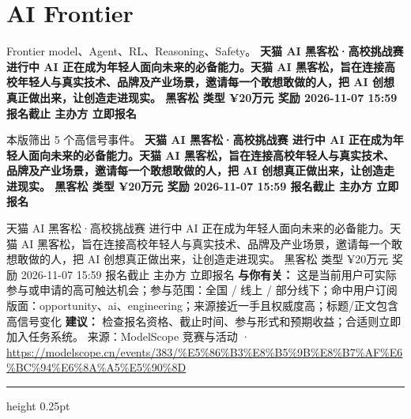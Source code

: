 \documentclass[10.5pt]{ctexart}
\begin{document}
\section*{AI Frontier}
{\color{ormuted} Frontier model、Agent、RL、Reasoning、Safety。}
\vspace{2mm}
{\LARGE\bfseries 天猫 AI 黑客松·高校挑战赛 进行中 AI 正在成为年轻人面向未来的必备能力。天猫 AI 黑客松，旨在连接高校年轻人与真实技术、品牌及产业场景，邀请每一个敢想敢做的人，把 AI 创想真正做出来，让创造走进现实。 黑客松 类型 ¥20万元 奖励 2026-11-07 15:59 报名截止 主办方 立即报名}\par
\vspace{1mm}
{\color{ormuted} 本版筛出 5 个高信号事件。}
\vspace{3mm}
{\Large\bfseries 天猫 AI 黑客松·高校挑战赛 进行中 AI 正在成为年轻人面向未来的必备能力。天猫 AI 黑客松，旨在连接高校年轻人与真实技术、品牌及产业场景，邀请每一个敢想敢做的人，把 AI 创想真正做出来，让创造走进现实。 黑客松 类型 ¥20万元 奖励 2026-11-07 15:59 报名截止 主办方 立即报名}\par
天猫 AI 黑客松·高校挑战赛 进行中 AI 正在成为年轻人面向未来的必备能力。天猫 AI 黑客松，旨在连接高校年轻人与真实技术、品牌及产业场景，邀请每一个敢想敢做的人，把 AI 创想真正做出来，让创造走进现实。 黑客松 类型 ¥20万元 奖励 2026-11-07 15:59 报名截止 主办方 立即报名
\textbf{与你有关：} 这是当前用户可实际参与或申请的高可触达机会；参与范围：全国 / 线上 / 部分线下；命中用户订阅版面：opportunity、ai、engineering；来源接近一手且权威度高；标题/正文包含高信号变化
\textbf{建议：} 检查报名资格、截止时间、参与形式和预期收益；合适则立即加入任务系统。
{\footnotesize\color{ormuted} 来源：ModelScope 竞赛与活动 · \url{https://modelscope.cn/events/383/%E5%86%B3%E8%B5%9B%E8%B7%AF%E6%BC%94%E6%8A%A5%E5%90%8D}}
\vspace{4mm}
\hrule height 0.25pt
\vspace{3mm}
\end{document}
